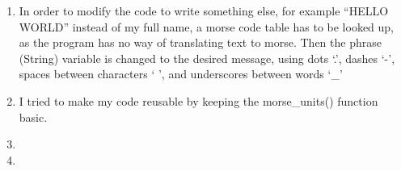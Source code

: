 \documentclass{article}
\begin{document}
\begin{enumerate}
  \item In order to modify the code to write something else, for example ``HELLO WORLD'' instead of my full name,
    a morse code table has to be looked up, as the program has no way of translating text to morse.
    Then the phrase (String) variable is changed to the desired message, 
    using dots `.', dashes `-', spaces between characters ` ', and underscores between words `_'
  \item I tried to make my code reusable by keeping the morse_units() function basic.
  \item
  \item
\end{enumerate}
\end{document}
